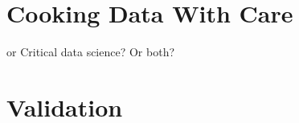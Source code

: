 \begin{comment}
"each preconceived idea should earn
its way into your analysis-including your own ideas from previous studies"(p.68)

TODO: Check against my analysis:
"Be careful about applying a language of intention,
motivation, or strategies unless the data support your assertions. You cannot assume
what is in someone' s mind-particularly if he or she does not tell you."(p.68)

"Take an examined stance about whose point of view your codes reflect,"(p.69)

\end{comment}

\section{Cooking Data With Care}
or Critical data science? Or both?

\section{Validation}
